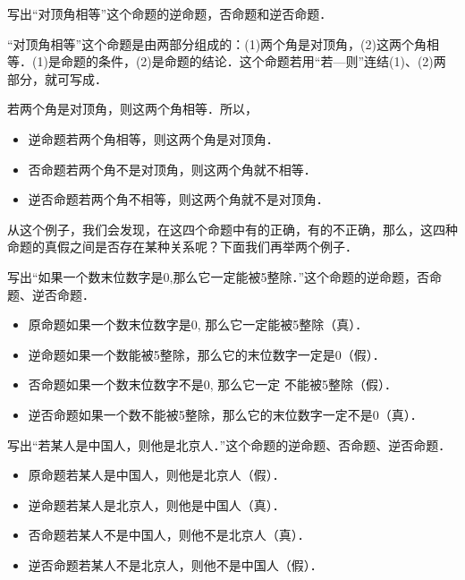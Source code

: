 \begin{example}
	写出“对顶角相等”这个命题的逆命题，否命题和逆否命题．
\end{example}

\begin{solution}
	“对顶角相等”这个命题是由两部分组成的：(1)两个角是对顶角，(2)这两个角相等．(1)是命题的条件，(2)是命题的结论．这个命题若用“若—则”连结(1)、(2)两部分，就可写成．
	
	若两个角是对顶角，则这两个角相等．所以，
	\begin{itemize}
		\item 逆命题\quad 若两个角相等，则这两个角是对顶角．
		\item 否命题\quad 若两个角不是对顶角，则这两个角就不相等．
		\item 逆否命题\quad 若两个角不相等，则这两个角就不是对顶角．
	\end{itemize}
\end{solution}

从这个例子，我们会发现，在这四个命题中有的正确，有的不正确，那么，这四种命题的真假之间是否存在某种关系呢？下面我们再举两个例子．

\begin{example}
	写出“如果一个数末位数字是0,那么它一定能被5整除．”这个命题的逆命题，否命题、逆否命题．
	\begin{itemize}
		\item 原命题\quad 如果一个数末位数字是0, 那么它一定能被5整除（真）．
		\item 逆命题\quad 如果一个数能被5整除，那么它的末位数字一定是0（假）．
		\item 否命题\quad 如果一个数末位数字不是0, 那么它一定 不能被5整除（假）．
		\item 逆否命题\quad 如果一个数不能被5整除，那么它的末位数字一定不是0（真）．
	\end{itemize}
\end{example}

\begin{example}
	写出“若某人是中国人，则他是北京人．”这个命题的逆命题、否命题、逆否命题．
	
	\begin{itemize}
		\item 原命题\quad 若某人是中国人，则他是北京人（假）．
		\item 逆命题\quad 若某人是北京人，则他是中国人（真）．
		\item 否命题\quad 若某人不是中国人，则他不是北京人（真）．
		\item 逆否命题\quad 若某人不是北京人，则他不是中国人（假）．
	\end{itemize}
\end{example}

